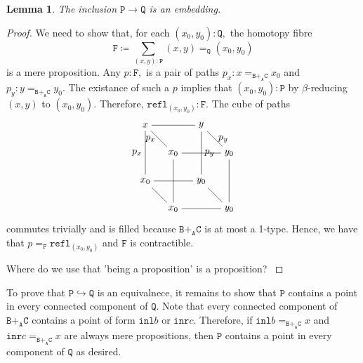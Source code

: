 \message{ !name(notes.tex)}\documentclass[12pt]{amsart}
\newcommand{\bydef}{\coloneqq}
\newcommand{\edit}[1]{{\color{red} #1 }}
\newcommand{\type}[1]{\mathtt{#1}}
\newcommand{\tin}{\colon}
\newcommand{\A}{\type{A}}
\newcommand{\B}{\type{B}}
\newcommand{\C}{\type{C}}
\renewcommand{\P}{\type{P}}
\newcommand{\Q}{\type{Q}}
\newcommand{\BAC}{\B +_{\A} \C}
\newcommand{\inl}{\type{inl}}
\newcommand{\inr}{\type{inr}}
\newcommand{\refl}{\type{refl}}
\newtheorem{lemma}{Lemma}
\theoremstyle{remark}
\theoremstyle{definition}
\begin{document}
\begin{lemma} \label{thm:inclusion-is-embedding}
%
  The inclusion
  \(
    \P \to \Q
  \)
  is an embedding.
%
\end{lemma}
\begin{proof}
%
  We need to show that, for each
  \(
     ( x_0 , y_0 ) \tin \Q,
  \)
  the homotopy fibre
  \[
     \type{F} \bydef
     \sum\limits_{ ( x,y ) \tin \P}
     ( x,y ) =_{\Q} ( x_0,y_0 )
  \]
  is a mere proposition. Any
  \(
    p \tin \type{F},
  \)
  is a pair of paths
  \(
    p_x \tin x =_{\BAC} x_0
  \)
  and
  \(
    p_y \tin y =_{\BAC} y_0.
  \)
  The existance of such a $p$ implies that 
  \(
    ( x_0,y_0 ) \tin \P
  \)
  by $ \beta $-reducing $ (x,y) $ to $ ( x_0,y_0 ) $. Therefore,
  \(
    \refl_{ ( x_0,y_0 ) } \tin \type{F}.
  \)
  The cube of paths
    \[
      \begin{tikzpicture}
        \node (1) at (0,2) {\( x \)};
        \node (2) at (2,2) {\( y \)};
        \node (3) at (1,1) {\( x_0 \)};
        \node (4) at (3,1) {\( y_0 \)};
        \node (5) at (0,0) {\( x_0 \)};
        \node (6) at (2,0) {\( y_0 \)};
        \node (7) at (1,-1) {\( x_0 \)};
        \node (8) at (3,-1) {\( y_0 \)};
        \draw [-] (1) to (2);
        \draw [-] (3) to (4);
        \draw [-] (5) to (6);
        \draw [-] (7) to (8);
        \draw [-] (1) to node [left] {\( p_x \)} (3);
        \draw [-] (2) to node [right] {\( p_y \)} (4);
        \draw [-] (5) to (7);
        \draw [-] (6) to (8);
        \draw [-] (1) to node [left] {\( p_x \)} (5);
        \draw [-] (2) to node [right] {\( p_y \)} (6);
        \draw [-] (3) to (7);
        \draw [-] (4) to (8); 
      \end{tikzpicture}
    \]
    commutes trivially and is filled because \( \BAC \) is at most a
    1-type. Hence, we have that
    \(
       p =_{ \type{F} } \refl_{ ( x_0,y_0 ) }
    \)
    and \( \type{F} \) is contractible.
    \par

    \edit{Where do we use that 'being a proposition' is a
      proposition?}
%
\end{proof}


To prove that
%
\( 
   \P \hookrightarrow \Q
\)
%
is an equivalnece, it remains to show that \( \P \) contains a point
in every connected component of \( \Q \). Note that every connected
component of \( \BAC \) contains a point of form \( \inl b \) or
\( \inr c \). Therefore, if
%
\(
   \inl b =_{\BAC} x
\)
%
and
%
\(
   \inr c =_{\BAC} x
\)
%
are always mere propositions, then \( \P \) contains a point in every
component of \( \Q \) as desired.
\par
\end{document}
